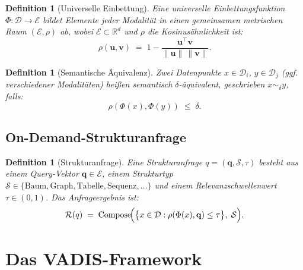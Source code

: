 ﻿\documentclass[12pt,a4paper]{article}
\newtheorem{definition}[theorem]{Definition}
\begin{document}
\begin{definition}[Universelle Einbettung]
\label{def:embedding}
Eine universelle Einbettungsfunktion $\Phi: \mathcal{D} \to \mathcal{E}$ 
bildet Elemente jeder Modalität in einen gemeinsamen metrischen Raum 
$(\mathcal{E}, \rho)$ ab, wobei $\mathcal{E} \subset \mathbb{R}^d$ 
und $\rho$ die Kosinusähnlichkeit ist:
\[
  \rho(\mathbf{u}, \mathbf{v}) 
  \;=\; 1 - \frac{\mathbf{u}^\top \mathbf{v}}{\|\mathbf{u}\|\,\|\mathbf{v}\|}.
\]
\end{definition}

\begin{definition}[Semantische Äquivalenz]
\label{def:semequiv}
Zwei Datenpunkte $x \in \mathcal{D}_i$, $y \in \mathcal{D}_j$ 
(ggf. verschiedener Modalitäten) heißen \emph{semantisch $\delta$-äquivalent}, 
geschrieben $x \sim_\delta y$, falls:
\[
  \rho\!\left(\Phi(x), \Phi(y)\right) \;\leq\; \delta.
\]
\end{definition}

\subsection{On-Demand-Strukturanfrage}

\begin{definition}[Strukturanfrage]
\label{def:query}
Eine Strukturanfrage $q = (\mathbf{q}, \mathcal{S}, \tau)$ besteht aus 
einem Query-Vektor $\mathbf{q} \in \mathcal{E}$, einem Strukturtyp $\mathcal{S} \in \{\text{Baum}, \text{Graph}, \text{Tabelle}, 
\text{Sequenz}, \ldots\}$ und einem Relevanz\-schwellenwert $\tau \in (0,1)$.
Das Anfrageergebnis ist:
\[
  \mathcal{R}(q) \;=\; \mathrm{Compose}\!\Bigl(
    \bigl\{ x \in \mathcal{D} : \rho(\Phi(x), \mathbf{q}) \leq \tau \bigr\},\;
    \mathcal{S}
  \Bigr).
\]
\end{definition}

\section{Das VADIS-Framework}
\label{sec:vadis}
\end{document}

